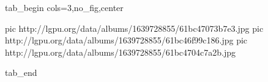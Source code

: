  
 
 
 
 

\ifcmt
  tab_begin cols=3,no_fig,center

     pic http://lgpu.org/data/albums/1639728855/61bc47073b7e3.jpg
		 pic http://lgpu.org/data/albums/1639728855/61bc46f99c186.jpg
		 pic http://lgpu.org/data/albums/1639728855/61bc4704c7a2b.jpg

  tab_end
\fi	
